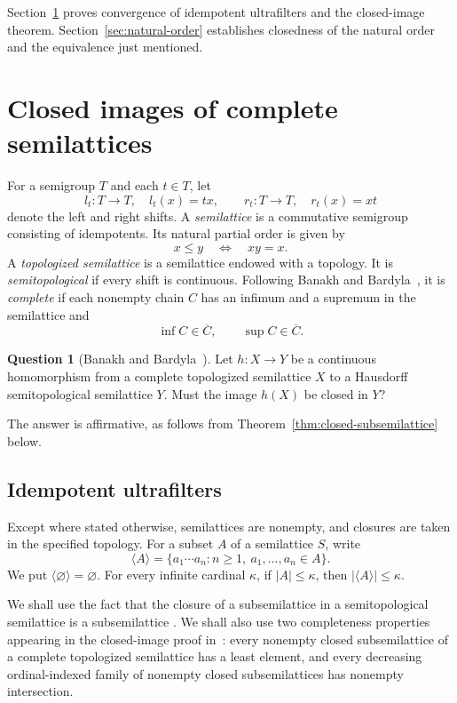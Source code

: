 \documentclass[11pt,a4paper]{article}
\theoremstyle{definition}
\newtheorem{question}[theorem]{Question}
\theoremstyle{remark}
\numberwithin{equation}{section}
\newcommand{\gen}[1]{\langle #1\rangle}
\newcommand{\cl}[1]{\overline{#1}}
\begin{document}
Section~\ref{sec:problem} proves convergence of idempotent ultrafilters
and the closed-image theorem. Section~\ref{sec:natural-order}
establishes closedness of the natural order and the equivalence just
mentioned.

\FloatBarrier
\section{Closed images of complete semilattices}\label{sec:problem}
For a semigroup \(T\) and each \(t\in T\), let
\[
l_t:T\to T,\quad l_t(x)=tx,\qquad
r_t:T\to T,\quad r_t(x)=xt
\]
denote the left and right shifts. A \emph{semilattice} is a commutative
semigroup consisting of idempotents. Its natural partial order is given by
\[
x\le y\quad\Longleftrightarrow\quad xy=x.
\]
A \emph{topologized semilattice} is a semilattice endowed with a topology.
It is \emph{semitopological} if every shift is continuous. Following
Banakh and Bardyla~\cite{BB}, it is \emph{complete} if each nonempty
chain \(C\) has an infimum and a supremum in the semilattice and
\[
\inf C\in\cl C,\qquad \sup C\in\cl C.
\]

\begin{tcolorbox}[colback=questionback,colframe=questionframe]
\begin{question}[Banakh and Bardyla~\cite{BB}]\label{q:main}
Let \(h:X\to Y\) be a continuous homomorphism from a complete topologized
semilattice \(X\) to a Hausdorff semitopological semilattice \(Y\).
Must the image \(h(X)\) be closed in \(Y\)?
\end{question}
\end{tcolorbox}

The answer is affirmative, as follows from
Theorem~\ref{thm:closed-subsemilattice} below.

\subsection{Idempotent ultrafilters}\label{sec:solution}
Except where stated otherwise, semilattices are nonempty, and closures
are taken in the specified topology. For a subset \(A\) of a
semilattice \(S\), write
\[
\gen A=\{a_1\cdots a_n:n\ge1,\ a_1,\ldots,a_n\in A\}.
\]
We put \(\gen\varnothing=\varnothing\). For every infinite cardinal
\(\kappa\), if \(|A|\le\kappa\), then \(|\gen A|\le\kappa\).

We shall use the fact that the closure of a subsemilattice in a
semitopological semilattice is a subsemilattice
\cite[Theorem~2.27]{HS}. We shall also use two completeness properties
appearing in the closed-image proof in~\cite{BB19}: every nonempty
closed subsemilattice of a complete topologized semilattice has a least
element, and every decreasing ordinal-indexed family of nonempty
closed subsemilattices has nonempty intersection.
\end{document}
